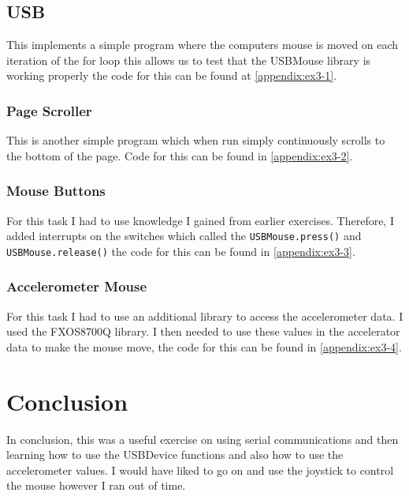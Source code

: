 \documentclass[a4paper,12pt]{scrartcl}
\begin{document}
{		\subsection{USB}
		{
			This implements a simple program where the computers mouse is moved on each iteration of the for loop this allows us to test that the USBMouse library is working properly the code for this can be found at \cref{appendix:ex3-1}.
			\subsubsection{Page Scroller}
			{
				This is another simple program which when run simply continuously scrolls to the bottom of the page. Code for this can be found in \cref{appendix:ex3-2}.
			}
			\subsubsection{Mouse Buttons}
			{
				For this task I had to use knowledge I gained from earlier exercises. Therefore, I added interrupts on the switches which called the \lstinline|USBMouse.press()| and \lstinline|USBMouse.release()| the code for this can be found in \cref{appendix:ex3-3}.
			}
			\subsubsection{Accelerometer Mouse}
			{
				For this task I had to use an additional library to access the accelerometer data. I used the FXOS8700Q\cite{accelLib} library. I then needed to use these values in the accelerator data to make the mouse move, the code for this can be found in \cref{appendix:ex3-4}.
			}
		}
	}
	\section{Conclusion}
	{
		In conclusion, this was a useful exercise on using serial communications and then learning how to use the USBDevice functions and also how to use the accelerometer values. I would have liked to go on and use the joystick to control the mouse however I ran out of time.
	}
	
	\newpage
	
	\printbibliography[heading=bibintoc,title=References]
\end{document}
